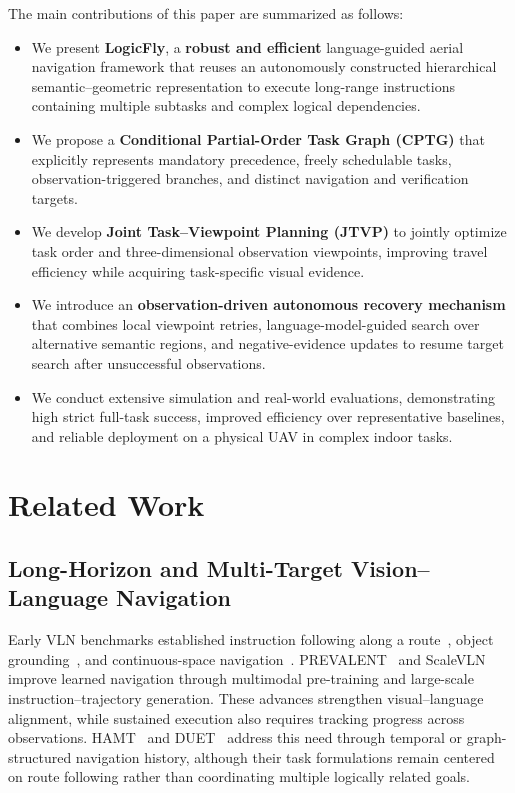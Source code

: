 \documentclass[letterpaper,10pt,journal]{IEEEtran}
\begin{document}
The main contributions of this paper are summarized as follows:
\begin{itemize}
\setlength{\itemsep}{0pt}
\setlength{\parsep}{0pt}
\item We present \textbf{LogicFly}, a \textbf{robust and efficient} language-guided aerial navigation framework that reuses an autonomously constructed hierarchical semantic--geometric representation to execute long-range instructions containing multiple subtasks and complex logical dependencies.
\item We propose a \textbf{Conditional Partial-Order Task Graph (CPTG)} that explicitly represents mandatory precedence, freely schedulable tasks, observation-triggered branches, and distinct navigation and verification targets.
\item We develop \textbf{Joint Task--Viewpoint Planning (JTVP)} to jointly optimize task order and three-dimensional observation viewpoints, improving travel efficiency while acquiring task-specific visual evidence.
\item We introduce an \textbf{observation-driven autonomous recovery mechanism} that combines local viewpoint retries, language-model-guided search over alternative semantic regions, and negative-evidence updates to resume target search after unsuccessful observations.
\item We conduct extensive simulation and real-world evaluations, demonstrating high strict full-task success, improved efficiency over representative baselines, and reliable deployment on a physical UAV in complex indoor tasks.
\end{itemize}



\section{Related Work}
\subsection{Long-Horizon and Multi-Target Vision--Language Navigation}

Early VLN benchmarks established instruction following along a route~\cite{anderson2018r2r,ku2020rxr}, object grounding~\cite{qi2020reverie,zhu2021soon}, and continuous-space navigation~\cite{krantz2020vlnce}. PREVALENT~\cite{hao2020prevalent} and ScaleVLN~\cite{wang2023scalevln} improve learned navigation through multimodal pre-training and large-scale instruction--trajectory generation. These advances strengthen visual--language alignment, while sustained execution also requires tracking progress across observations. HAMT~\cite{chen2021hamt} and DUET~\cite{chen2022duet} address this need through temporal or graph-structured navigation history, although their task formulations remain centered on route following rather than coordinating multiple logically related goals.
\end{document}
